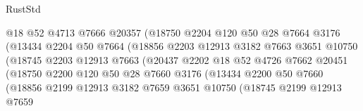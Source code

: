 \begin{lexlean}{RustStd}
\begin{coremodule}
                                @18
                                @52
                                @4713
                                @7666
                                @20357
                                (@18750
                                  @2204
                                  @120
                                  @50
                                  @28
                                  @7664
                                  @3176
                                  (@13434
                                    @2204
                                    @50
                                    @7664
                                    (@18856
                                      @2203
                                      @12913
                                      @3182
                                      @7663
                                      @3651
                                      @10750
                                      (@18745
                                        @2203
                                        @12913
                                        @7663
                                        (@20437
                                          @2202
                                          @18
                                          @52
                                          @4726
                                          @7662
                                          @20451
                                          (@18750
                                            @2200
                                            @120
                                            @50
                                            @28
                                            @7660
                                            @3176
                                            (@13434
                                              @2200
                                              @50
                                              @7660
                                              (@18856
                                                @2199
                                                @12913
                                                @3182
                                                @7659
                                                @3651
                                                @10750
                                                (@18745
                                                  @2199
                                                  @12913
                                                  @7659

\end{coremodule}
\end{lexlean}
